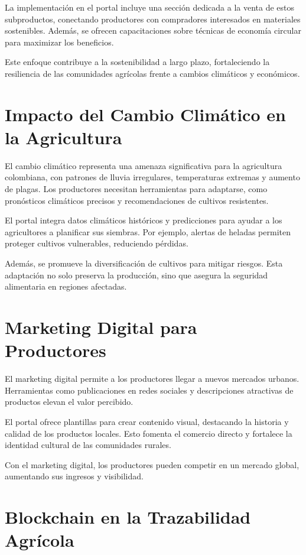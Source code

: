 La implementación en el portal incluye una sección dedicada a la venta de estos subproductos, conectando productores con compradores interesados en materiales sostenibles. Además, se ofrecen capacitaciones sobre técnicas de economía circular para maximizar los beneficios.

Este enfoque contribuye a la sostenibilidad a largo plazo, fortaleciendo la resiliencia de las comunidades agrícolas frente a cambios climáticos y económicos.

\section{Impacto del Cambio Climático en la Agricultura}

El cambio climático representa una amenaza significativa para la agricultura colombiana, con patrones de lluvia irregulares, temperaturas extremas y aumento de plagas. Los productores necesitan herramientas para adaptarse, como pronósticos climáticos precisos y recomendaciones de cultivos resistentes.

El portal integra datos climáticos históricos y predicciones para ayudar a los agricultores a planificar sus siembras. Por ejemplo, alertas de heladas permiten proteger cultivos vulnerables, reduciendo pérdidas.

Además, se promueve la diversificación de cultivos para mitigar riesgos. Esta adaptación no solo preserva la producción, sino que asegura la seguridad alimentaria en regiones afectadas.

\section{Marketing Digital para Productores}

El marketing digital permite a los productores llegar a nuevos mercados urbanos. Herramientas como publicaciones en redes sociales y descripciones atractivas de productos elevan el valor percibido.

El portal ofrece plantillas para crear contenido visual, destacando la historia y calidad de los productos locales. Esto fomenta el comercio directo y fortalece la identidad cultural de las comunidades rurales.

Con el marketing digital, los productores pueden competir en un mercado global, aumentando sus ingresos y visibilidad.

\section{Blockchain en la Trazabilidad Agrícola}


